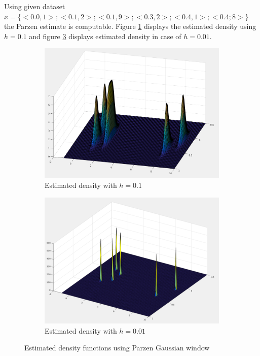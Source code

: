 \documentclass[12pt]{article}
\begin{document}
\begin{itemize}
Using given dataset $x = \{<0.0, 1>; <0.1, 2>; <0.1, 9>; <0.3, 2>; <0.4, 1>; <0.4; 8>\}$ the Parzen estimate is computable. Figure \ref{fig:2-1} displays the estimated density using $h = 0.1$ and figure \ref{fig:2-2} displays estimated density in case of $h = 0.01$. 
\begin{figure}
\centering
\begin{subfigure}{1\textwidth}
\centering
\includegraphics[scale=0.4]{Imgs/2-1.png}
\caption{Estimated density with $h = 0.1$}
\label{fig:2-1}
\end{subfigure}
\begin{subfigure}{1\textwidth}
\centering
\includegraphics[scale=0.35]{Imgs/2-2.png}
\caption{Estimated density with $h = 0.01$}
\label{fig:2-2}
\end{subfigure}
\caption{Estimated density functions using Parzen Gaussian window}
\end{figure}


\end{itemize}
\end{document}
